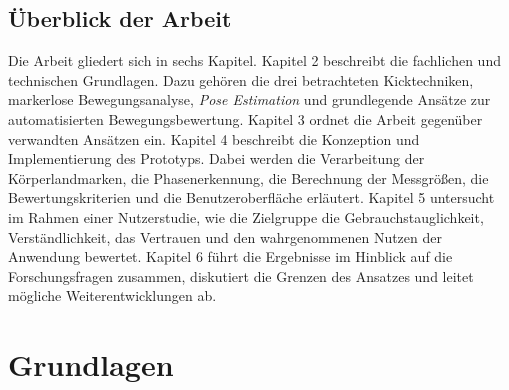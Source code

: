 \documentclass[intern]{cgMA}
\begin{document}
\subsection{Überblick der Arbeit}
Die Arbeit gliedert sich in sechs Kapitel. Kapitel 2 beschreibt die fachlichen und technischen Grundlagen. Dazu gehören die drei betrachteten Kicktechniken, markerlose Bewegungsanalyse, \textit{Pose Estimation} und grundlegende Ansätze zur automatisierten Bewegungsbewertung. Kapitel 3 ordnet die Arbeit gegenüber verwandten Ansätzen ein. Kapitel 4 beschreibt die Konzeption und Implementierung des Prototyps. Dabei werden die Verarbeitung der Körperlandmarken, die Phasenerkennung, die Berechnung der Messgrößen, die Bewertungskriterien und die Benutzeroberfläche erläutert. Kapitel 5 untersucht im Rahmen einer Nutzerstudie, wie die Zielgruppe die Gebrauchstauglichkeit, Verständlichkeit, das Vertrauen und den wahrgenommenen Nutzen der Anwendung bewertet. Kapitel 6 führt die Ergebnisse im Hinblick auf die Forschungsfragen zusammen, diskutiert die Grenzen des Ansatzes und leitet mögliche Weiterentwicklungen ab.

\section{Grundlagen}
\end{document}
